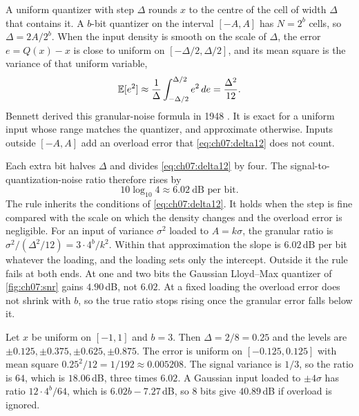 A uniform quantizer with step $\Delta$ rounds $x$ to the centre of the cell of width $\Delta$ that contains it. A $b$-bit quantizer on the interval $[-A,A]$ has $N=2^b$ cells, so $\Delta=2A/2^b$. When the input density is smooth on the scale of $\Delta$, the error $e=Q(x)-x$ is close to uniform on $[-\Delta/2,\Delta/2]$, and its mean square is the variance of that uniform variable,
\begin{equation}\label{eq:ch07:delta12}
\mathbb{E}[e^2]\approx\frac{1}{\Delta}\int_{-\Delta/2}^{\Delta/2}e^2\,de=\frac{\Delta^2}{12}.
\end{equation}
Bennett derived this granular-noise formula in 1948 \cite{bennett1948}. It is exact for a uniform input whose range matches the quantizer, and approximate otherwise. Inputs outside $[-A,A]$ add an overload error that \cref{eq:ch07:delta12} does not count.

Each extra bit halves $\Delta$ and divides \cref{eq:ch07:delta12} by four. The signal-to-quantization-noise ratio therefore rises by
\begin{equation}\label{eq:ch07:6db}
10\log_{10}4\approx6.02\ \text{dB per bit}.
\end{equation}
The rule inherits the conditions of \cref{eq:ch07:delta12}. It holds when the step is fine compared with the scale on which the density changes and the overload error is negligible. For an input of variance $\sigma^2$ loaded to $A=k\sigma$, the granular ratio is $\sigma^2/(\Delta^2/12)=3\cdot4^b/k^2$. Within that approximation the slope is $6.02$\,dB per bit whatever the loading, and the loading sets only the intercept. Outside it the rule fails at both ends. At one and two bits the Gaussian Lloyd--Max quantizer of \cref{fig:ch07:snr} gains $4.90$\,dB, not $6.02$. At a fixed loading the overload error does not shrink with $b$, so the true ratio stops rising once the granular error falls below it.

\begin{example}\label{ex:ch07:uniform}
Let $x$ be uniform on $[-1,1]$ and $b=3$. Then $\Delta=2/8=0.25$ and the levels are $\pm0.125,\pm0.375,\pm0.625,\pm0.875$. The error is uniform on $[-0.125,0.125]$ with mean square $0.25^2/12=1/192\approx0.005208$. The signal variance is $1/3$, so the ratio is $64$, which is $18.06$\,dB, three times $6.02$. A Gaussian input loaded to $\pm4\sigma$ has ratio $12\cdot4^b/64$, which is $6.02b-7.27$\,dB, so $8$ bits give $40.89$\,dB if overload is ignored.
\end{example}

